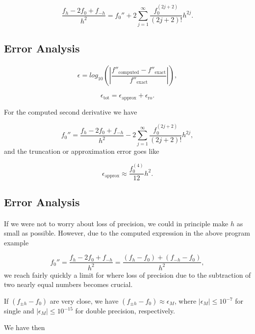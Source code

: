 \documentclass[%
oneside,                 %
final,                   %
10pt]{article}
\begin{document}
\[
 \frac{ f_h -2f_0 +f_{-h}}{h^2}=f_0''+2\sum_{j=1}^{\infty}\frac{f_0^{(2j+2)}}{(2j+2)!}h^{2j}.
\]



\subsection*{Error Analysis}


\paragraph{}
\[
   \epsilon=log_{10}\left(\left|\frac{f''_{\mbox{computed}}-f''_{\mbox{exact}}}
                 {f''_{\mbox{exact}}}\right|\right),
\]

\[
   \epsilon_{\mbox{tot}}=\epsilon_{\mbox{approx}}+\epsilon_{\mbox{ro}}.
\]

For the computed second derivative  we have

\[
 f_0''=\frac{ f_h -2f_0 +f_{-h}}{h^2}-2\sum_{j=1}^{\infty}\frac{f_0^{(2j+2)}}{(2j+2)!}h^{2j},
\]
and the truncation or approximation error goes like

\[
  \epsilon_{\mbox{approx}}\approx \frac{f_0^{(4)}}{12}h^{2}.
\]



\subsection*{Error Analysis}


\paragraph{}
If we were not to worry about loss of precision, we could in principle
make $h$ as small as possible.
However, due to the computed expression in the above program example

\[
 f_0''=\frac{ f_h -2f_0 +f_{-h}}{h^2}=\frac{ (f_h -f_0) +(f_{-h}-f_0)}{h^2},
\]
we reach fairly quickly a limit for where loss of precision due to the subtraction
of two nearly equal numbers becomes crucial.

If $(f_{\pm h} -f_0)$ are very close, we have
$(f_{\pm h} -f_0)\approx \epsilon_M$, where $|\epsilon_M|\le 10^{-7}$ for single and
$|\epsilon_M|\le 10^{-15}$ for double precision, respectively.

We have then
\end{document}
